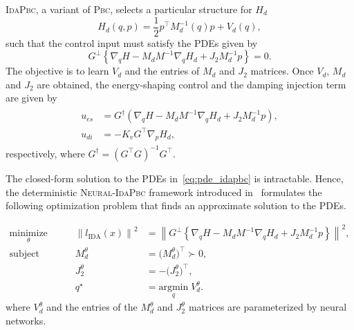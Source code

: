 \textsc{IdaPbc}, a variant of \textsc{Pbc}, selects a particular structure for
$H_d$ 
\begin{equation}
  H_d(q, p) = \frac{1}{2} p^\top M_d^{-1}(q) p + V_d(q),
  \label{eq:idapbc_desired_hamiltonian}
\end{equation}
such that the control input must satisfy the PDEs given by 
\begin{equation}
  G^\perp \left\{ \nabla_qH - M_dM^{-1} \nabla_qH_d + J_2M_d^{-1}p \right\} = 0.
  \label{eq:pde_idapbc}
\end{equation}
The objective is to learn $V_d$ and the entries of $M_d$ and $J_2$ matrices.
Once $V_d$, $M_d$ and $J_2$ are obtained, the energy-shaping control and the
damping injection term are given by
%
\begin{align}
  \begin{split}
  u_{es} &= G^{\dagger} \left(\nabla_qH - M_dM^{-1} \nabla_qH_d + J_2M_d^{-1}p\right), \\
  u_{di} &= -K_v G^\top \nabla_p H_d,
  \end{split}
  \label{eq:idapbc_ues}
\end{align}
%
respectively, where $G^{\dagger} = \left(G^\top G\right)^{-1} G^\top$.

The closed-form solution to the PDEs in~\eqref{eq:pde_idapbc} is intractable.
Hence, the deterministic \textsc{Neural-IdaPbc} framework introduced
in~\cite{neuralidapbc} formulates the following optimization problem that finds
an approximate solution to the PDEs.

\begin{equation}
  \begin{aligned}
      \underset{\theta }{\textrm{minimize}} 
      &&\quad \left\| l_{\textrm{IDA}} (x) \right\|^2 &= \left\| G^\perp \left\{ \nabla_qH - M_dM^{-1} \nabla_qH_d + J_2M_d^{-1}p \right\} \right\|^2, \\
      \textrm{subject to} 
      &&\quad M_d^\theta &= \big( M_d^\theta \big)^\top \succ 0, \\
      &&\quad J_2^\theta &= -\big( J_2^\theta \big)^\top, \\
      &&\quad q^\star &= \underset{q}{\textrm{argmin}}\; V_d^\theta.
  \end{aligned}    
  \label{eq:idapbc_finite_optim}%
\end{equation}
where $V^\theta_d$ and the entries of the $M^\theta_d$ and $J^\theta_2$ matrices
are parameterized by neural networks. 


